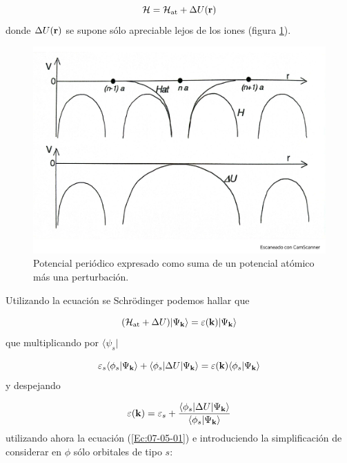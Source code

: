 \begin{equation}
	\mathcal{H} = \mathcal{H}_{\text{at}} + \Delta U(\mathbf{r})
\end{equation} 
donde $\Delta U (\mathbf{r})$ se supone sólo apreciable lejos de los iones (figura \ref{Fig:07-05}).

\begin{figure}[h!] \centering
	\includegraphics[scale=0.3]{Cuerpo/Ch_07/Fotos libro 5.pdf}
	\caption{Potencial periódico expresado como suma de un potencial atómico más una perturbación.}
	\label{Fig:07-05}
\end{figure}    

Utilizando la ecuación se Schrödinger podemos hallar que

\begin{equation}
	(\mathcal{H}_\text{at} + \Delta U) |\Psi_{\mathbf{k}} \rangle = \varepsilon(\mathbf{k}) |\Psi_{\mathbf{k}} \rangle
\end{equation}
que multiplicando por $\langle \psi_s |$   

\begin{equation}
	\varepsilon_s \langle \phi_s |\Psi_{\mathbf{k}} \rangle + \langle \phi_s | \Delta U |\Psi_{\mathbf{k}} \rangle = \varepsilon(\mathbf{k}) \langle \phi_s |\Psi_{\mathbf{k}} \rangle
\end{equation}
y despejando 

\begin{equation}
	\varepsilon(\mathbf{k}) = \varepsilon_s + \frac{\langle \phi_s |\Delta U | \Psi_{\mathbf{k}} \rangle}{\langle \phi_s |\Psi_{\mathbf{k}} \rangle}
\end{equation}
utilizando ahora la ecuación (\ref{Ec:07-05-01}) e introduciendo la simplificación de considerar en $\phi$ sólo orbitales de tipo $s$:

